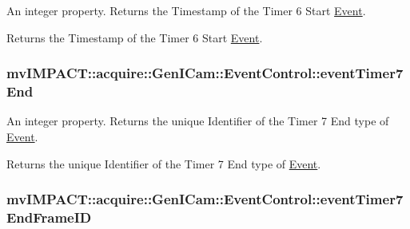 An integer property. Returns the Timestamp of the Timer 6 Start \hyperlink{classmv_i_m_p_a_c_t_1_1acquire_1_1_event}{Event}. 

Returns the Timestamp of the Timer 6 Start \hyperlink{classmv_i_m_p_a_c_t_1_1acquire_1_1_event}{Event}. \hypertarget{classmv_i_m_p_a_c_t_1_1acquire_1_1_gen_i_cam_1_1_event_control_a6aa8a6a11210f9e09fdbdef45fccf564}{
\subsubsection[{event\+Timer7\+End}]{ mv\+I\+M\+P\+A\+C\+T\+::acquire\+::\+Gen\+I\+Cam\+::\+Event\+Control\+::event\+Timer7\+End}}\label{classmv_i_m_p_a_c_t_1_1acquire_1_1_gen_i_cam_1_1_event_control_a6aa8a6a11210f9e09fdbdef45fccf564}


An integer property. Returns the unique Identifier of the Timer 7 End type of \hyperlink{classmv_i_m_p_a_c_t_1_1acquire_1_1_event}{Event}. 

Returns the unique Identifier of the Timer 7 End type of \hyperlink{classmv_i_m_p_a_c_t_1_1acquire_1_1_event}{Event}. \hypertarget{classmv_i_m_p_a_c_t_1_1acquire_1_1_gen_i_cam_1_1_event_control_a0952872b43edc49b5d89cb1816dff03c}{
\subsubsection[{event\+Timer7\+End\+Frame\+I\+D}]{ mv\+I\+M\+P\+A\+C\+T\+::acquire\+::\+Gen\+I\+Cam\+::\+Event\+Control\+::event\+Timer7\+End\+Frame\+I\+D}}\label{classmv_i_m_p_a_c_t_1_1acquire_1_1_gen_i_cam_1_1_event_control_a0952872b43edc49b5d89cb1816dff03c}


